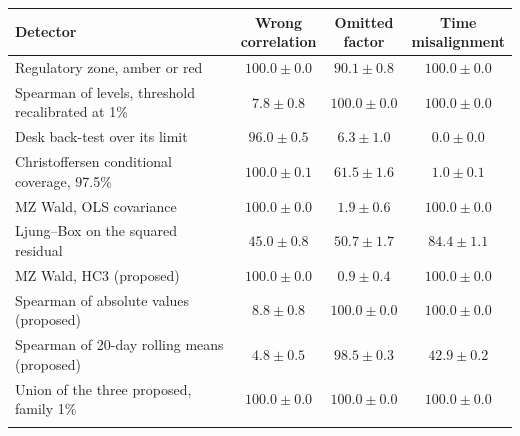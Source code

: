 \begin{table}[htbp]
\begin{tabular}{>{\raggedright\arraybackslash}p{5.2cm}ccc}
\toprule
Detector & \shortstack{Wrong\\correlation} & \shortstack{Omitted\\factor} & \shortstack{Time\\misalignment} \\
\midrule
Regulatory zone, amber or red & $100.0\pm0.0$ & $90.1\pm0.8$ & $100.0\pm0.0$ \\ \addlinespace[0.8ex]
Spearman of levels, threshold recalibrated at 1\% & $7.8\pm0.8$ & $100.0\pm0.0$ & $100.0\pm0.0$ \\ \addlinespace[0.8ex]
Desk back-test over its limit & $96.0\pm0.5$ & $6.3\pm1.0$ & $0.0\pm0.0$ \\ \addlinespace[0.8ex]
Christoffersen conditional coverage, 97.5\% & $100.0\pm0.1$ & $61.5\pm1.6$ & $1.0\pm0.1$ \\ \addlinespace[0.8ex]
MZ Wald, OLS covariance & $100.0\pm0.0$ & $1.9\pm0.6$ & $100.0\pm0.0$ \\ \addlinespace[0.8ex]
Ljung--Box on the squared residual & $45.0\pm0.8$ & $50.7\pm1.7$ & $84.4\pm1.1$ \\ \addlinespace[0.8ex]
MZ Wald, HC3 (proposed) & $100.0\pm0.0$ & $0.9\pm0.4$ & $100.0\pm0.0$ \\ \addlinespace[0.8ex]
Spearman of absolute values (proposed) & $8.8\pm0.8$ & $100.0\pm0.0$ & $100.0\pm0.0$ \\ \addlinespace[0.8ex]
Spearman of 20-day rolling means (proposed) & $4.8\pm0.5$ & $98.5\pm0.3$ & $42.9\pm0.2$ \\ \addlinespace[0.8ex]
Union of the three proposed, family 1\% & $100.0\pm0.0$ & $100.0\pm0.0$ & $100.0\pm0.0$ \\ \addlinespace[0.8ex]
\bottomrule
\end{tabular}
\end{table}
